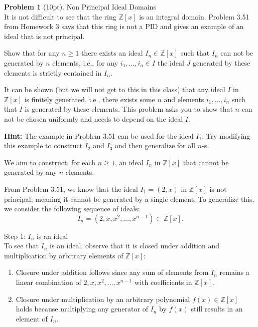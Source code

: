 \documentclass[12pt]{article}
\theoremstyle{definition}
\newtheorem{problem}{Problem}
\begin{document}
\begin{problem}[10pt] Non Principal Ideal Domains\\
      It is not difficult to see that the ring $\mathbb{Z}[x]$ is an integral domain. Problem 3.51
      from Homework 3 says that this ring is not a PID and gives an example of an ideal that is not
      principal.

      Show that for any $n \geq 1$ there exists an ideal $I_n \in \mathbb{Z}[x]$ such that $I_n$ can
      not be generated by $n$ elements, i.e., for any $i_1,\ldots,i_n \in I$ the ideal $J$ generated
      by these elements is strictly contained in $I_n$.

      It can be shown (but we will not get to this in this class) that any ideal $I$ in $\mathbb{Z}[x]$
      is finitely generated, i.e., there exists some $n$ and elements $i_1, \ldots, i_n$ such that $I$
      is generated by these elements. This problem asks you to show that $n$ can not be chosen uniformly
      and needs to depend on the ideal $I$.

      \textbf{Hint:} The example in Problem 3.51 can be used for the ideal $I_1$. Try modifying this
      example to construct $I_2$ and $I_3$ and then generalize for all $n$-s.

      \begin{solution}
            We aim to construct, for each $n \geq 1$, an ideal $I_n$ in $\mathbb{Z}[x]$ that cannot be generated by any $n$ elements. 
            
            From Problem 3.51, we know that the ideal $I_1 = (2, x)$ in $\mathbb{Z}[x]$ is not principal, meaning it cannot be generated by a single element. 
            To generalize this, we consider the following sequence of ideals:
            \[
            I_n = (2, x, x^2, \dots, x^{n-1}) \subset \mathbb{Z}[x].
            \]
            
            Step 1: $I_n$ is an ideal\\
            To see that $I_n$ is an ideal, observe that it is closed under addition and multiplication by arbitrary elements of $\mathbb{Z}[x]$:
            \begin{enumerate}[label=(\arabic*)]
                  \item Closure under addition follows since any sum of elements from $I_n$ remains a linear combination of $2, x, x^2, \dots, x^{n-1}$ with coefficients in $\mathbb{Z}[x]$.
                  \item Closure under multiplication by an arbitrary polynomial $f(x) \in \mathbb{Z}[x]$ holds because multiplying any generator of $I_n$ by $f(x)$ still results in an element of $I_n$.
            \end{enumerate}
            

\end{solution}
\end{problem}
\end{document}
